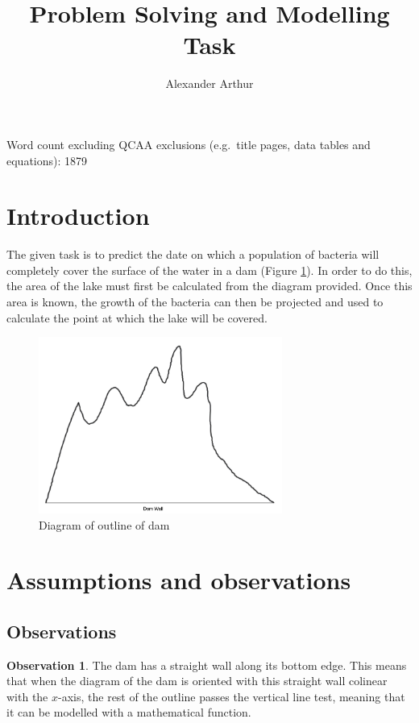 \documentclass[a4paper]{article}
\title{Problem Solving and Modelling Task}
\author{Alexander Arthur}
\theoremstyle{definition}
\newtheorem{observation}{Observation}
\begin{document}
\maketitle
\setcounter{tocdepth}{1}
\tableofcontents

\vfill

Word count excluding QCAA exclusions (e.g.\ title pages, data tables and equations): 1879

\newpage

\section{Introduction}
    The given task is to predict the date on which a population of bacteria will completely cover the surface of the water in a dam (Figure \ref{figDamOutline}). In order to do this, the area of the lake must first be calculated from the diagram provided. Once this area is known, the growth of the bacteria can then be projected and used to calculate the point at which the lake will be covered.

    \begin{figure} %
        \centering
        \includegraphics[width = 8cm]{damDiagram.png}
        \caption{Diagram of outline of dam}
        \label{figDamOutline}
    \end{figure}



\section{Assumptions and observations}

    \subsection{Observations}

        \begin{observation}
            The dam has a straight wall along its bottom edge. This means that when the diagram of the dam is oriented with this straight wall colinear with the $x$-axis, the rest of the outline passes the vertical line test, meaning that it can be modelled with a mathematical function.
        \end{observation}
\end{document}
